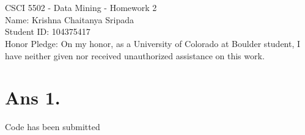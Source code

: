 \documentclass[10pt]{article}
\begin{document}
\section*{}
\begin{flushleft}
CSCI 5502 - Data Mining - Homework 2\\
Name: Krishna Chaitanya Sripada\\
Student ID: 104375417\\
Honor Pledge: On my honor, as a University of Colorado at Boulder student, I have neither given nor received unauthorized assistance on this work.
\end{flushleft}
\section*{Ans 1.}
\begin{flushleft}
Code has been submitted
\end{flushleft}
\end{document}
